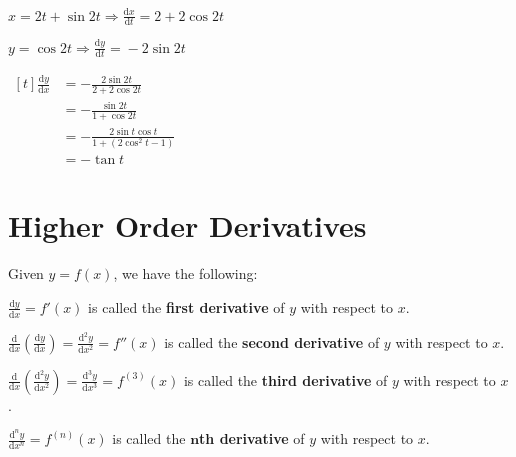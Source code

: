 \documentclass[11pt,a4paper]{book}
\begin{document}
\begin{example}
\begin{tasks}[label=(\alph*),label-width=3.5ex]
\task ${\displaystyle x=2t+\sin2t\Rightarrow\frac{\mathrm{d}x}{\mathrm{d}t}=2+2\cos2t}$

${\displaystyle y=\cos2t\Rightarrow\frac{\mathrm{d}y}{\mathrm{d}t}=}-2\sin2t$

$
\begin{aligned}[t]
\frac{\mathrm{d}y}{\mathrm{d}x} & =-\frac{2\sin2t}{2+2\cos2t}\\
 & =-\frac{\sin2t}{1+\cos2t}\\
 & =-\frac{2\sin t\cos t}{1+(2\cos^{2}t-1)}\\
 & =-\tan t
\end{aligned}
$

\end{tasks}

\end{example}

\section{Higher Order Derivatives}

\begin{tcolorbox}[colback=blue!5, colframe=black, boxrule=.4pt, sharpish corners]

Given $y=f\left(x\right)$, we have the following:

\begin{tasks}[label=\arabic*.,label-width=3.5ex]

\task  ${\displaystyle \frac{\mathrm{d}y}{\mathrm{d}x}=f'\left(x\right)}$ is called
the \textbf{first derivative} of $y$ with respect to $x$.

\task  ${\displaystyle \frac{\mathrm{d}}{\mathrm{d}x}\left(\frac{\mathrm{d}y}{\mathrm{d}x}\right)=\frac{\mathrm{d}^{2}y}{\mathrm{d}x^{2}}=f''\left(x\right)}$
is called the \textbf{second derivative} of $y$ with respect to $x$.

\task  ${\displaystyle \frac{\mathrm{d}}{\mathrm{d}x}\left(\frac{\mathrm{d}^{2}y}{\mathrm{d}x^{2}}\right)=\frac{\mathrm{d}^{3}y}{\mathrm{d}x^{3}}=f^{(3)}\left(x\right)}$
is called the \textbf{third derivative} of $y$ with respect to $x$.

\task  ${\displaystyle \frac{\mathrm{d}^{n}y}{\mathrm{d}x^{n}}}=f^{(n)}\left(x\right)$
is called the \textbf{$\boldsymbol{n}$th derivative }of $y$ with
respect to $x$.

\end{tasks}
\end{tcolorbox}
\end{document}
